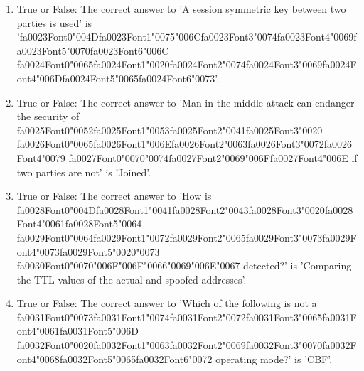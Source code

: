 \documentclass[12pt]{article}
\begin{document}
\begin{enumerate}[label=\arabic*.]
\item True or False: The correct answer to 'A session symmetric key between two parties is used' is '{\csname fa0023Font0\endcsname\char"004D}{\csname fa0023Font1\endcsname\char"0075}{\char"006C}{\csname fa0023Font3\endcsname\char"0074}{\csname fa0023Font4\endcsname\char"0069}{\csname fa0023Font5\endcsname\char"0070}{\csname fa0023Font6\endcsname\char"006C} {\csname fa0024Font0\endcsname\char"0065}{\csname fa0024Font1\endcsname\char"0020}{\csname fa0024Font2\endcsname\char"0074}{\csname fa0024Font3\endcsname\char"0069}{\csname fa0024Font4\endcsname\char"006D}{\csname fa0024Font5\endcsname\char"0065}{\csname fa0024Font6\endcsname\char"0073}'.
\item True or False: The correct answer to 'Man in the middle attack can endanger the security of {\csname fa0025Font0\endcsname\char"0052}{\csname fa0025Font1\endcsname\char"0053}{\csname fa0025Font2\endcsname\char"0041}{\csname fa0025Font3\endcsname\char"0020} {\csname fa0026Font0\endcsname\char"0065}{\csname fa0026Font1\endcsname\char"006E}{\csname fa0026Font2\endcsname\char"0063}{\csname fa0026Font3\endcsname\char"0072}{\csname fa0026Font4\endcsname\char"0079} {\csname fa0027Font0\endcsname\char"0070}{\char"0074}{\csname fa0027Font2\endcsname\char"0069}{\char"006F}{\csname fa0027Font4\endcsname\char"006E} if two parties are not' is 'Joined'.
\item True or False: The correct answer to 'How is {\csname fa0028Font0\endcsname\char"004D}{\csname fa0028Font1\endcsname\char"0041}{\csname fa0028Font2\endcsname\char"0043}{\csname fa0028Font3\endcsname\char"0020}{\csname fa0028Font4\endcsname\char"0061}{\csname fa0028Font5\endcsname\char"0064} {\csname fa0029Font0\endcsname\char"0064}{\csname fa0029Font1\endcsname\char"0072}{\csname fa0029Font2\endcsname\char"0065}{\csname fa0029Font3\endcsname\char"0073}{\csname fa0029Font4\endcsname\char"0073}{\csname fa0029Font5\endcsname\char"0020}{\char"0073} {\csname fa0030Font0\endcsname\char"0070}{\char"006F}{\char"006F}{\char"0066}{\char"0069}{\char"006E}{\char"0067} detected?' is 'Comparing the TTL values of the actual and spoofed addresses'.
\item True or False: The correct answer to 'Which of the following is not a {\csname fa0031Font0\endcsname\char"0073}{\csname fa0031Font1\endcsname\char"0074}{\csname fa0031Font2\endcsname\char"0072}{\csname fa0031Font3\endcsname\char"0065}{\csname fa0031Font4\endcsname\char"0061}{\csname fa0031Font5\endcsname\char"006D} {\csname fa0032Font0\endcsname\char"0020}{\csname fa0032Font1\endcsname\char"0063}{\csname fa0032Font2\endcsname\char"0069}{\csname fa0032Font3\endcsname\char"0070}{\csname fa0032Font4\endcsname\char"0068}{\csname fa0032Font5\endcsname\char"0065}{\csname fa0032Font6\endcsname\char"0072} operating mode?' is 'CBF'.

\end{enumerate}
\end{document}

